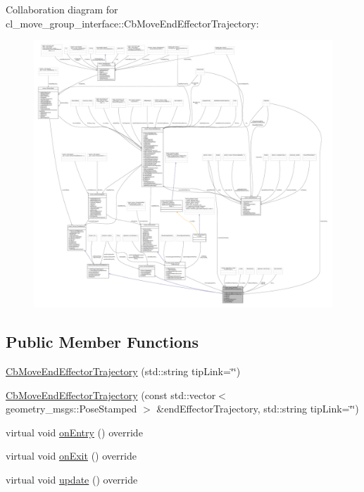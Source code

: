 Collaboration diagram for cl\+\_\+move\+\_\+group\+\_\+interface\+:\+:Cb\+Move\+End\+Effector\+Trajectory\+:
\nopagebreak
\begin{figure}[H]
\begin{center}
\leavevmode
\includegraphics[width=350pt]{classcl__move__group__interface_1_1CbMoveEndEffectorTrajectory__coll__graph}
\end{center}
\end{figure}
\subsection*{Public Member Functions}
\begin{DoxyCompactItemize}
\item 
\hyperlink{classcl__move__group__interface_1_1CbMoveEndEffectorTrajectory_af7e718b0c53e912fd74968abbb0a4810}{Cb\+Move\+End\+Effector\+Trajectory} (std\+::string tip\+Link=\char`\"{}\char`\"{})
\item 
\hyperlink{classcl__move__group__interface_1_1CbMoveEndEffectorTrajectory_ae6985de3f8f0e1ec7dea88c1e551889a}{Cb\+Move\+End\+Effector\+Trajectory} (const std\+::vector$<$ geometry\+\_\+msgs\+::\+Pose\+Stamped $>$ \&end\+Effector\+Trajectory, std\+::string tip\+Link=\char`\"{}\char`\"{})
\item 
virtual void \hyperlink{classcl__move__group__interface_1_1CbMoveEndEffectorTrajectory_aaedd074fd178c6390a4a3f1ccff23ad3}{on\+Entry} () override
\item 
virtual void \hyperlink{classcl__move__group__interface_1_1CbMoveEndEffectorTrajectory_a4952c092e69bc6e9831568de32888da5}{on\+Exit} () override
\item 
virtual void \hyperlink{classcl__move__group__interface_1_1CbMoveEndEffectorTrajectory_a57fedb6a0603fe569842a13faf19f5cd}{update} () override
\end{DoxyCompactItemize}
